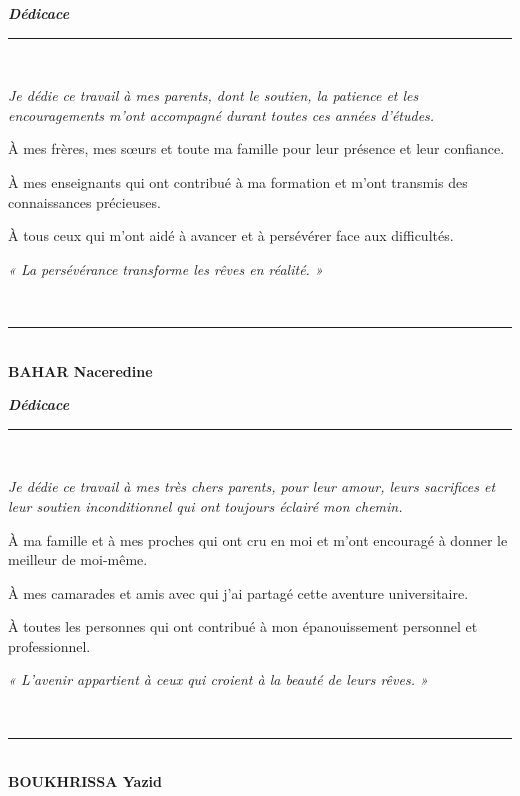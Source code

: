 \documentclass[12pt,a4paper]{report}
\begin{document}
\cleardoublepage
\thispagestyle{empty}
\vspace*{4cm}

\begin{center}
  {\large\textit{\textcolor{primary}{\bfseries Dédicace}}}\\[0.8cm]
  \rule{0.4\linewidth}{0.4pt}\\[1cm]

  {\normalsize\itshape
  Je dédie ce travail à mes parents, dont le soutien, la patience et les
  encouragements m'ont accompagné durant toutes ces années d'études.

  À mes frères, mes sœurs et toute ma famille pour leur présence et leur
  confiance.

  À mes enseignants qui ont contribué à ma formation et m'ont transmis des
  connaissances précieuses.

  À tous ceux qui m'ont aidé à avancer et à persévérer face aux difficultés.

  \vspace{1cm}
  \textit{« La persévérance transforme les rêves en réalité. »}

  }\\[1cm]

  \rule{0.4\linewidth}{0.4pt}\\[0.5cm]
  {\bfseries BAHAR Naceredine}
\end{center}

\newpage

\cleardoublepage
\thispagestyle{empty}
\vspace*{4cm}

\begin{center}
  {\large\textit{\textcolor{primary}{\bfseries Dédicace}}}\\[0.8cm]
  \rule{0.4\linewidth}{0.4pt}\\[1cm]

  {\normalsize\itshape
  Je dédie ce travail à mes très chers parents, pour leur amour, leurs sacrifices
  et leur soutien inconditionnel qui ont toujours éclairé mon chemin.

  À ma famille et à mes proches qui ont cru en moi et m'ont encouragé à donner
  le meilleur de moi-même.

  À mes camarades et amis avec qui j'ai partagé cette aventure universitaire.

  À toutes les personnes qui ont contribué à mon épanouissement personnel et
  professionnel.

  \vspace{1cm}
  \textit{« L'avenir appartient à ceux qui croient à la beauté de leurs rêves. »}

  }\\[1cm]

  \rule{0.4\linewidth}{0.4pt}\\[0.5cm]
  {\bfseries BOUKHRISSA Yazid}
\end{center}
\end{document}
